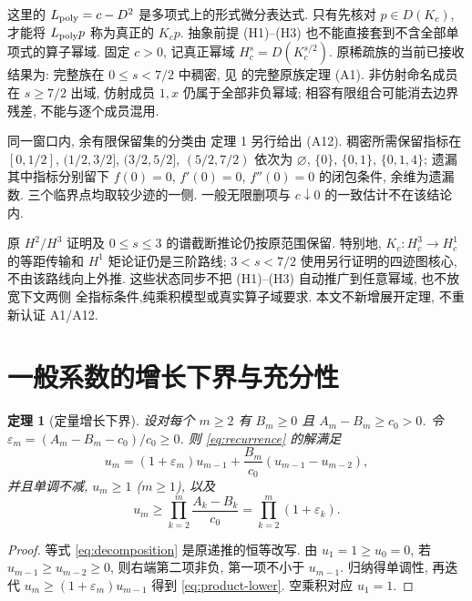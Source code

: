 \documentclass[UTF8]{ctexart}
\newtheorem{theorem}{定理}[section]
\begin{document}
这里的 $L_{\rm poly}=c-D^2$ 是多项式上的形式微分表达式.
只有先核对 $p\in D(K_c)$, 才能将 $L_{\rm poly}p$ 称为真正的 $K_cp$.
抽象前提 (H1)--(H3) 也不能直接套到不含全部单项式的算子幂域.
固定 $c>0$, 记真正幂域 $H_c^s=D(K_c^{s/2})$. 原稀疏族的当前已接收结果为:
完整族在 $0\le s<7/2$ 中稠密, 见 
的完整原族定理 (A1). 非仿射命名成员在 $s\ge7/2$ 出域, 仿射成员 $1,x$
仍属于全部非负幂域; 相容有限组合可能消去边界残差, 不能与逐个成员混用.

同一窗口内, 余有限保留集的分类由  定理 1
另行给出 (A12). 稠密所需保留指标在 $[0,1/2]$, $(1/2,3/2]$,
$(3/2,5/2]$, $(5/2,7/2)$ 依次为 $\varnothing$, $\{0\}$,
$\{0,1\}$, $\{0,1,4\}$; 遗漏其中指标分别留下 $f(0)=0$, $f'(0)=0$,
$f''(0)=0$ 的闭包条件, 余维为遗漏数. 三个临界点均取较少迹的一侧.
一般无限删项与 $c\downarrow0$ 的一致估计不在该结论内.

原 $H^2/H^3$ 证明及 $0\le s\le3$ 的谱截断推论仍按原范围保留.
特别地, $K_c:H_c^3\to H_c^1$ 的等距传输和 $H^1$ 矩论证仍是三阶路线;
$3<s<7/2$ 使用另行证明的四迹图核心, 不由该路线向上外推.
这些状态同步不把 (H1)--(H3) 自动推广到任意幂域, 也不放宽下文两侧
全指标条件,纯乘积模型或真实算子域要求. 本文不新增展开定理, 不重新认证 A1/A12.

\section{一般系数的增长下界与充分性}

\begin{theorem}[定量增长下界]\label{thm:growth}
设对每个 $m\ge2$ 有 $B_m\ge0$ 且 $A_m-B_m\ge c_0>0$.
令 $\varepsilon_m=(A_m-B_m-c_0)/c_0\ge0$.
则 \eqref{eq:recurrence} 的解满足
\begin{equation}\label{eq:decomposition}
u_m=(1+\varepsilon_m)u_{m-1}
+\frac{B_m}{c_0}(u_{m-1}-u_{m-2}),
\end{equation}
并且单调不减, $u_m\ge1$ ($m\ge1$), 以及
\begin{equation}\label{eq:product-lower}
u_m\ge \prod_{k=2}^m\frac{A_k-B_k}{c_0}
=\prod_{k=2}^m(1+\varepsilon_k).
\end{equation}
\end{theorem}
\begin{proof}
等式 \eqref{eq:decomposition} 是原递推的恒等改写.
由 $u_1=1\ge u_0=0$, 若 $u_{m-1}\ge u_{m-2}\ge0$,
则右端第二项非负, 第一项不小于 $u_{m-1}$.
归纳得单调性, 再迭代 $u_m\ge(1+\varepsilon_m)u_{m-1}$
得到 \eqref{eq:product-lower}. 空乘积对应 $u_1=1$.
\end{proof}
\end{document}
